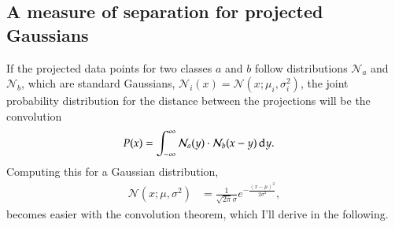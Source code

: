 \subsection{A measure of separation for projected Gaussians}
If the projected data points for two classes $a$ and $b$ follow distributions $\mathcal{N}_a$ and $\mathcal{N}_b$, which are standard Gaussians, $\mathcal{N}_i(x) = \mathcal{N}(x;\mu_i, \sigma_i^2)$, the joint probability distribution for the distance between the projections will be the convolution
\begin{align}
	P(x) &= \int_{-\infty}^\infty \mathcal{N}_a(y)\cdot\mathcal{N}_b(x-y) \operatorname{d\!} y.
\end{align}
Computing this for a Gaussian distribution,
\begin{align}
	\mathcal{N}(x;\mu, \sigma^2) &= \frac{1}{\sqrt{2\pi}\sigma}e^{-\frac{(x-\mu)^2}{2\sigma^2}},
\end{align}
becomes easier with the convolution theorem, which I'll derive in the following.

